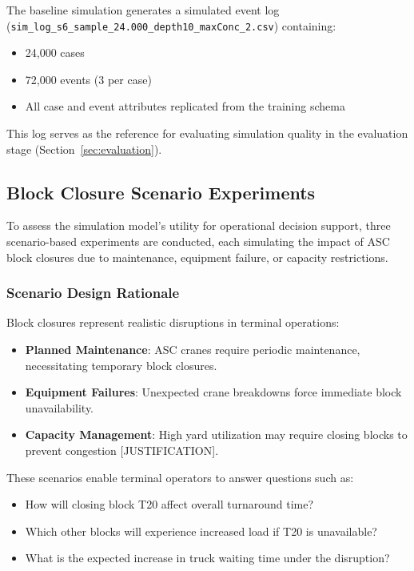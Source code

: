        The baseline simulation generates a simulated event log (\texttt{sim\_log\_s6\_sample\_24.000\_depth10\_maxConc\_2.csv}) containing:
        
        \begin{itemize}
            \item 24,000 cases
            \item 72,000 events (3 per case)
            \item All case and event attributes replicated from the training schema
        \end{itemize}
        
        This log serves as the reference for evaluating simulation quality in the evaluation stage (Section~\ref{sec:evaluation}).
        
    \subsection{Block Closure Scenario Experiments}
    
    To assess the simulation model's utility for operational decision support, three scenario-based experiments are conducted, each simulating the impact of ASC block closures due to maintenance, equipment failure, or capacity restrictions.

        \subsubsection{Scenario Design Rationale}
        
        Block closures represent realistic disruptions in terminal operations:
        
        \begin{itemize}
            \item \textbf{Planned Maintenance}: ASC cranes require periodic maintenance, necessitating temporary block closures.
            \item \textbf{Equipment Failures}: Unexpected crane breakdowns force immediate block unavailability.
            \item \textbf{Capacity Management}: High yard utilization may require closing blocks to prevent congestion [JUSTIFICATION].
        \end{itemize}
        
        These scenarios enable terminal operators to answer questions such as:
        
        \begin{itemize}
            \item How will closing block T20 affect overall turnaround time?
            \item Which other blocks will experience increased load if T20 is unavailable?
            \item What is the expected increase in truck waiting time under the disruption?
        \end{itemize}

